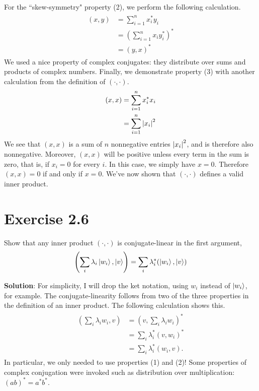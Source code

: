 \documentclass{book}
\begin{document}
    For the ``skew-symmetry" property (2), we perform the following calculation.
    \begin{align}
    \begin{aligned}
        (x, y) &= \sum_{i=1}^n x_i^* y_i \\
        &= \left(\sum_{i=1}^n x_i y_i^*\right)^* \\
        &= (y, x)^*
    \end{aligned}
    \end{align}
    We used a nice property of complex conjugates: they distribute over sums and products of complex numbers. Finally, we demonstrate property (3) with another calculation from the definition of $(\cdot, \cdot)$.
    \begin{align}
    \begin{aligned}
        (x, x) &= \sum_{i=1}^n x_i^* x_i \\
        &= \sum_{i=1}^n \abs{x_i}^2
    \end{aligned}
    \end{align}
    We see that $(x,x)$ is a sum of $n$ nonnegative entries $\abs{x_i}^2$, and is therefore also nonnegative. Moreover, $(x,x)$ will be positive unless every term in the sum is zero, that is, if $x_i = 0$ for every $i$. In this case, we simply have $x = 0$. Therefore $(x,x) = 0$ if and only if $x = 0$. We've now shown that $(\cdot, \cdot)$ defines a valid inner product.
    
\section*{Exercise 2.6}
    Show that any inner product $(\cdot, \cdot)$ is conjugate-linear in the first argument,
    \begin{align}
        \left(\sum_i \lambda_i \ket{w_i}, \ket{v}\right) = \sum_i \lambda_i^* (\ket{w_i}, \ket{v})
    \end{align}
    
    \textbf{Solution}: For simplicity, I will drop the ket notation, using $w_i$ instead of $\ket{w_i}$, for example. The conjugate-linearity follows from two of the three properties in the definition of an inner product. The following calculation shows this.
    \begin{align}
    \begin{aligned}
        \left(\sum_i \lambda_i w_i, v\right) &= \left(v, \sum_i \lambda_i w_i\right)^* \\
        &= \sum_i \lambda_i^* (v, w_i)^* \\
        &= \sum_i \lambda_i^* (w_i, v).
    \end{aligned}
    \end{align}
    In particular, we only needed to use properties (1) and (2)! Some properties of complex conjugation were invoked such as distribution over multiplication: $(ab)^* = a^* b^*$.
    
\end{document}

